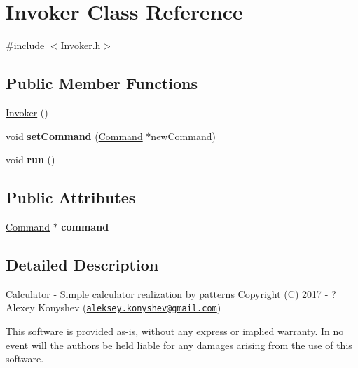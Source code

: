 \hypertarget{class_invoker}{}\section{Invoker Class Reference}
\label{class_invoker}


{\ttfamily \#include $<$Invoker.\+h$>$}

\subsection*{Public Member Functions}
\begin{DoxyCompactItemize}
\item 
\hyperlink{class_invoker_a23a9f865dabc7f79cf27085d6aabbc81}{Invoker} ()
\item 
\hypertarget{class_invoker_a85b4ed1f7a614fd301a927eea9aebd34}{}void {\bfseries set\+Command} (\hyperlink{class_command}{Command} $\ast$new\+Command)\label{class_invoker_a85b4ed1f7a614fd301a927eea9aebd34}

\item 
\hypertarget{class_invoker_abb638c8a0375ffe8b8bc36807bc34feb}{}void {\bfseries run} ()\label{class_invoker_abb638c8a0375ffe8b8bc36807bc34feb}

\end{DoxyCompactItemize}
\subsection*{Public Attributes}
\begin{DoxyCompactItemize}
\item 
\hypertarget{class_invoker_a66787cc9fe2056889d2d091bb9759892}{}\hyperlink{class_command}{Command} $\ast$ {\bfseries command}\label{class_invoker_a66787cc9fe2056889d2d091bb9759892}

\end{DoxyCompactItemize}


\subsection{Detailed Description}
Calculator -\/ Simple calculator realization by patterns Copyright (C) 2017 -\/ ? Alexey Konyshev (\href{mailto:aleksey.konyshev@gmail.com}{\tt aleksey.\+konyshev@gmail.\+com})

This software is provided \textquotesingle{}as-\/is\textquotesingle{}, without any express or implied warranty. In no event will the authors be held liable for any damages arising from the use of this software.


